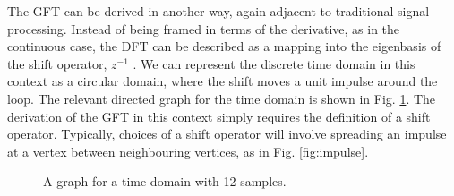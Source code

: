 \documentclass[12pt,a4paper]{article} %
\begin{document}
The GFT can be derived in another way, again adjacent to traditional signal processing. Instead of being framed in terms of the derivative, as in the continuous case, the DFT can be described as a mapping into the eigenbasis of the shift operator, $z^{-1}$ \cite{moura}. We can represent the discrete time domain in this context as a circular domain, where the shift moves a unit impulse around the loop. The relevant directed graph for the time domain is shown in Fig. \ref{fig:cycle12}. The derivation of the GFT in this context simply requires the definition of a shift operator. Typically, choices of a shift operator will involve spreading an impulse at a vertex between neighbouring vertices, as in Fig. \ref{fig:impulse}.\\

\begin{figure}[!ht]
    \centering
    \caption{A graph for a time-domain with 12 samples.}
    \label{fig:cycle12}
\end{figure}
\end{document}
